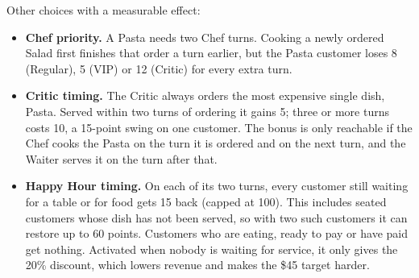 Other choices with a measurable effect:
\begin{itemize}[leftmargin=*]
  \item \textbf{Chef priority.} A Pasta needs two Chef turns. Cooking a newly ordered Salad first finishes that order a turn earlier, but the Pasta customer loses 8 (Regular), 5 (VIP) or 12 (Critic) for every extra turn.
  \item \textbf{Critic timing.} The Critic always orders the most expensive single dish, Pasta. Served within two turns of ordering it gains 5; three or more turns costs 10, a 15-point swing on one customer. The bonus is only reachable if the Chef cooks the Pasta on the turn it is ordered and on the next turn, and the Waiter serves it on the turn after that.
  \item \textbf{Happy Hour timing.} On each of its two turns, every customer still waiting for a table or for food gets 15 back (capped at 100). This includes seated customers whose dish has not been served, so with two such customers it can restore up to 60 points. Customers who are eating, ready to pay or have paid get nothing. Activated when nobody is waiting for service, it only gives the 20\% discount, which lowers revenue and makes the \$45 target harder.
\end{itemize}
\fussy
